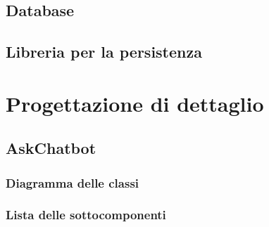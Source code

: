 \documentclass[10pt, a4paper]{article}
\begin{document}
\subsection{Database} %

\subsection{Libreria per la persistenza} %

\newpage

\section{Progettazione di dettaglio}

\subsection{AskChatbot}
\subsubsection{Diagramma delle classi}
\subsubsection{Lista delle sottocomponenti}
\end{document}
